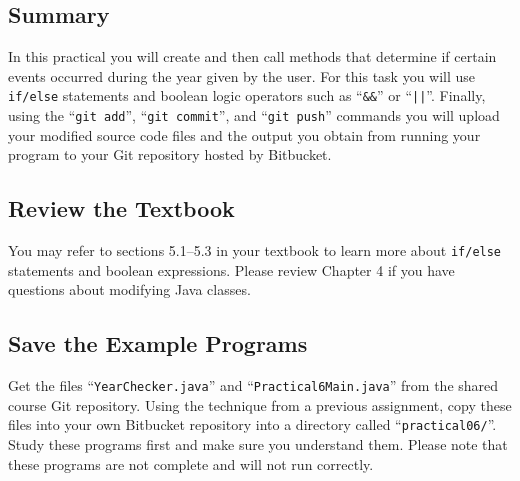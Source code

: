 




\subsection*{Summary}
\vspace*{-.05in}

In this practical you will create and then call methods that determine if certain events occurred during the year given
by the user. For this task you will use {\tt if/else} statements and boolean logic operators such as ``{\tt \&\&}'' or
``{\tt ||}''.  Finally, using the ``{\tt git add}'', ``{\tt git  commit}'', and ``{\tt git push}'' commands you will
upload your modified source code files and the output you obtain from running your program to your Git repository hosted
by Bitbucket.

\vspace*{-.1in}
\subsection*{Review the Textbook}
\vspace*{-.05in}

You may refer to sections 5.1--5.3 in your textbook to learn more about {\tt if/else} statements and boolean
expressions.  Please review Chapter 4 if you have questions about modifying Java classes.

\vspace*{-.1in}
\subsection*{Save the Example Programs}
\vspace*{-.05in}

Get the files ``{\tt YearChecker.java}'' and ``{\tt Practical6Main.java}'' from the shared course Git repository. Using
the technique from a previous assignment, copy these files into your own Bitbucket repository into a directory called
``{\tt practical06/}''. Study these programs first and make sure you understand them. Please note that these programs
are not complete and will not run correctly.

